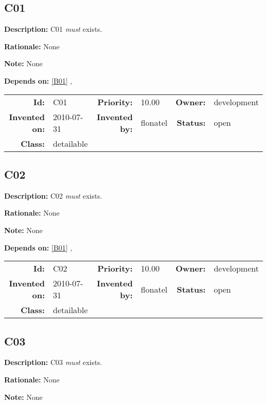 \subsection{C01}\label{C01}
\textbf{Description:} C01 \textsl{must} exists.

\textbf{Rationale:} None

\textbf{Note:} None

\textbf{Depends on:} \ref{B01} , 

\par
{\small \begin{center}\begin{tabular}{rlrlrl}
\textbf{Id:} & C01 & \textbf{Priority:} & 10.00 & \textbf{Owner:} & development \\ 
\textbf{Invented on:} & 2010-07-31 & \textbf{Invented by:} & flonatel & \textbf{Status:} & open \\ 
\textbf{Class:} & detailable & & & & \\ 
\end{tabular}\end{center} }%
\subsection{C02}\label{C02}
\textbf{Description:} C02 \textsl{must} exists.

\textbf{Rationale:} None

\textbf{Note:} None

\textbf{Depends on:} \ref{B01} , 

\par
{\small \begin{center}\begin{tabular}{rlrlrl}
\textbf{Id:} & C02 & \textbf{Priority:} & 10.00 & \textbf{Owner:} & development \\ 
\textbf{Invented on:} & 2010-07-31 & \textbf{Invented by:} & flonatel & \textbf{Status:} & open \\ 
\textbf{Class:} & detailable & & & & \\ 
\end{tabular}\end{center} }%
\subsection{C03}\label{C03}
\textbf{Description:} C03 \textsl{must} exists.

\textbf{Rationale:} None

\textbf{Note:} None

